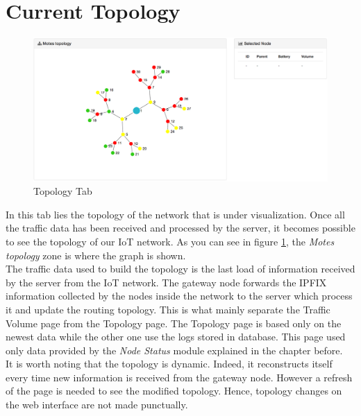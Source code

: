 \section{Current Topology}

\begin{figure}[!h]
	\centering
	\includegraphics[width=1.1\textwidth]{res/topologyinterface.png}
	\caption{Topology Tab}
	\label{fig:topo}
\end{figure}

In this tab lies the topology of the network that is under visualization. Once all the traffic data has been received and processed by the server, it becomes possible to see the topology of our IoT network. As you can see in figure \ref{fig:topo}, the \textit{Motes topology} zone is where the graph is shown. \\

The traffic data used to build the topology is the last load of information received by the server from the IoT network. The gateway node forwards the IPFIX information collected by the nodes inside the network to the server which process it and update the routing topology. This is what mainly separate the Traffic Volume page from the Topology page. The Topology page is based only on the newest data while the other one use the logs stored in database. This page used only data provided by the \textit{Node Status} module explained in the chapter before.\\

It is worth noting that the topology is dynamic. Indeed, it reconstructs itself every time new information is received from the gateway node. However a refresh of the page is needed to see the modified topology. Hence, topology changes on the web interface are not made punctually. \\

